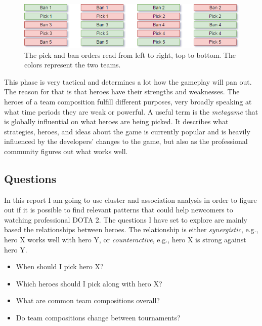 \documentclass[report.tex]{subfiles}
\begin{document}
\begin{figure}[H]
  \centering
  \includegraphics[width=\textwidth]{./images/dota2}
  \caption{The pick and ban orders read from left to right, top to bottom. The colors represent the two teams.}
   \label{fig:picks_bans}
\end{figure}

This phase is very tactical and determines a lot how the gameplay will pan out. The reason for that is that heroes have their strengths and weaknesses. The heroes of a team composition fulfill different purposes, very broadly speaking at what time periods they are weak or powerful. A useful term is the \textit{metagame} that is globally influential on what heroes are being picked. It describes what strategies, heroes, and ideas about the game is currently popular and is heavily influenced by the developers' changes to the game, but also as the professional community figures out what works well.

\subsection*{Questions}

In this report I am going to use cluster and association analysis in order to figure out if it is possible to find relevant patterns that could help newcomers to watching professional DOTA 2. The questions I have set to explore are mainly based the relationships between heroes. The relationship is either \textit{synergistic}, e.g., hero X works well with hero Y, or \textit{counteractive}, e.g., hero X is strong against hero Y.

\begin{itemize}
\item When should I pick hero X?
\item Which heroes should I pick along with hero X?
\item What are common team compositions overall?
\item Do team compositions change between tournaments?
\end{itemize}
\end{document}
